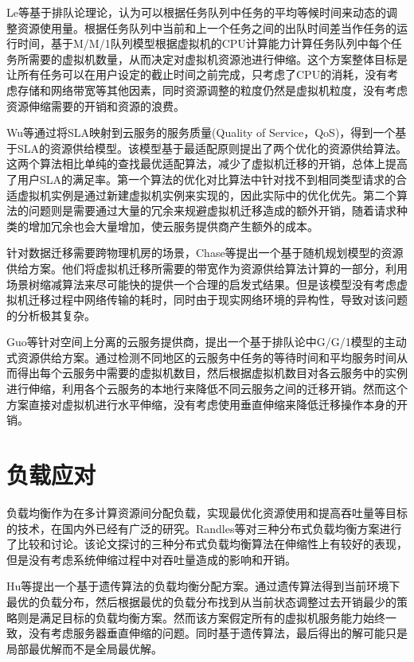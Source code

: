 Le等基于排队论理论，认为可以根据任务队列中任务的平均等候时间来动态的调整资源使用量\cite{le2013dynamic}。根据任务队列中当前和上一个任务之间的出队时间差当作任务的运行时间，基于M/M/1队列模型根据虚拟机的CPU计算能力计算任务队列中每个任务所需要的虚拟机数量，从而决定对虚拟机资源池进行伸缩。这个方案整体目标是让所有任务可以在用户设定的截止时间之前完成，只考虑了CPU的消耗，没有考虑存储和网络带宽等其他因素，同时资源调整的粒度仍然是虚拟机粒度，没有考虑资源伸缩需要的开销和资源的浪费。

Wu等通过将SLA映射到云服务的服务质量(Quality of Service，QoS)，得到一个基于SLA的资源供给模型\cite{wu2014sla}。该模型基于最适配原则提出了两个优化的资源供给算法。这两个算法相比单纯的查找最优适配算法，减少了虚拟机迁移的开销，总体上提高了用户SLA的满足率。第一个算法的优化对比算法中针对找不到相同类型请求的合适虚拟机实例是通过新建虚拟机实例来实现的，因此实际中的优化优先。第二个算法的问题则是需要通过大量的冗余来规避虚拟机迁移造成的额外开销，随着请求种类的增加冗余也会大量增加，使云服务提供商产生额外的成本。

针对数据迁移需要跨物理机房的场景，Chase等提出一个基于随机规划模型的资源供给方案\cite{chase2017joint}。他们将虚拟机迁移所需要的带宽作为资源供给算法计算的一部分，利用场景树缩减算法来尽可能快的提供一个合理的启发式结果。但是该模型没有考虑虚拟机迁移过程中网络传输的耗时，同时由于现实网络环境的异构性，导致对该问题的分析极其复杂。

Guo等针对空间上分离的云服务提供商，提出一个基于排队论中G/G/1模型的主动式资源供给方案\cite{guo2016geoscale}。通过检测不同地区的云服务中任务的等待时间和平均服务时间从而得出每个云服务中需要的虚拟机数目，然后根据虚拟机数目对各云服务中的实例进行伸缩，利用各个云服务的本地行来降低不同云服务之间的迁移开销。然而这个方案直接对虚拟机进行水平伸缩，没有考虑使用垂直伸缩来降低迁移操作本身的开销。

\section{负载应对}
负载均衡作为在多计算资源间分配负载，实现最优化资源使用和提高吞吐量等目标的技术，在国内外已经有广泛的研究。Randles等对三种分布式负载均衡方案进行了比较和讨论\cite{randles2010comparative}。该论文探讨的三种分布式负载均衡算法在伸缩性上有较好的表现，但是没有考虑系统伸缩过程中对吞吐量造成的影响和开销。

Hu等提出一个基于遗传算法的负载均衡分配方案\cite{hu2010scheduling}。通过遗传算法得到当前环境下最优的负载分布，然后根据最优的负载分布找到从当前状态调整过去开销最少的策略则是满足目标的负载均衡方案。然而该方案假定所有的虚拟机服务能力始终一致，没有考虑服务器垂直伸缩的问题。同时基于遗传算法，最后得出的解可能只是局部最优解而不是全局最优解。

